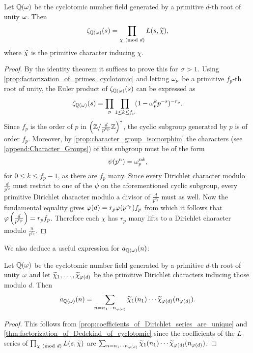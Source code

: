 \documentclass[12pt,oneside]{book}
\begin{document}
    \begin{theorem}\label{thm:factorization_of_Dedekind_of_cyclotomic}
      Let $\mathbb{Q}(\omega)$ be the cyclotomic number field generated by a primitive $d$-th root of unity $\omega$. Then
      \[
        \zeta_{\mathbb{Q}(\omega)}(s) = \prod_{\chi \ \left(\text{mod }d\right)}L(s,\widetilde{\chi}),
      \]
      where $\widetilde{\chi}$ is the primitive character inducing $\chi$.
    \end{theorem}
    \begin{proof}
      By the identity theorem it suffices to prove this for $\sigma > 1$. Using \cref{prop:factorization_of_primes_cyclotomic} and letting $\omega_{p}$ be a primitive $f_{p}$-th root of unity, the Euler product of $\zeta_{\mathbb{Q}(\omega)}(s)$ can be expressed as
      \[
        \zeta_{\mathbb{Q}(\omega)}(s) = \prod_{p}\prod_{1 \le k \le f_{p}}(1-\omega_{p}^{k}p^{-s})^{-r_{p}}.
      \]
      Since $f_{p}$ is the order of $p$ in $\left(\mathbb{Z}/\frac{d}{p^{e_{p}}}\mathbb{Z}\right)^{\ast}$, the cyclic subgroup generated by $p$ is of order $f_{p}$. Moreover, by \cref{prop:character_group_isomorphim} the characters (see \cref{append:Character_Groups}) of this subgroup must be of the form
      \[
        \psi(p^{n}) = \omega_{p}^{nk},
      \]
      for $0 \le k \le f_{p}-1$, as there are $f_{p}$ many. Since every Dirichlet character modulo $\frac{d}{p^{e_{p}}}$ must restrict to one of the $\psi$ on the aforementioned cyclic subgroup, every primitive Dirichlet character modulo a divisor of $\frac{d}{p^{e_{p}}}$ must as well.  Now the fundamental equality gives $\varphi(d) = r_{p}\varphi(p^{e_{p}})f_{p}$ from which it follows that $\varphi\left(\frac{d}{p^{e_{p}}}\right) = r_{p}f_{p}$. Therefore each $\chi$ has $r_{p}$ many lifts to a Dirichlet character modulo $\frac{n}{p^{e_{p}}}$. 
    \end{proof}

    We also deduce a useful expression for $a_{\mathbb{Q}(\omega)}(n)$:

    \begin{proposition}
      Let $\mathbb{Q}(\omega)$ be the cyclotomic number field generated by a primitive $d$-th root of unity $\omega$ and let $\widetilde{\chi}_{1},\ldots,\widetilde{\chi}_{\varphi(d)}$ be the primitive Dirichlet characters inducing those modulo $d$. Then
      \[
        a_{\mathbb{Q}(\omega)}(n) = \sum_{n = n_{1} \cdots n_{\varphi(d)}}\widetilde{\chi}_{1}(n_{1}) \cdots \widetilde{\chi}_{\varphi(d)}(n_{\varphi(d)}).
      \]
    \end{proposition}
    \begin{proof}
      This follows from \cref{prop:coefficients_of_Dirichlet_series_are_unique} and \cref{thm:factorization_of_Dedekind_of_cyclotomic} since the coefficients of the $L$-series of $\prod_{\chi \ \left(\text{mod }d\right)}L(s,\widetilde{\chi})$ are $\sum_{n = n_{1} \cdots n_{\varphi(d)}}\widetilde{\chi}_{1}(n_{1}) \cdots \widetilde{\chi}_{\varphi(d)}(n_{\varphi(d)})$.
    \end{proof}
\end{document}
